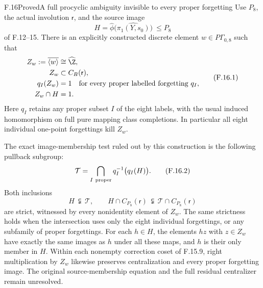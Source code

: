 \begin{claim}{F.16}{Proved}{A full procyclic ambiguity invisible to every proper forgetting}
Use $P_8$, the actual involution $\mathsf r$, and the
source image
\[
       H=\widehat\phi\bigl(\widehat{\pi_1(Y,s_0)}\bigr)
                         \ \leq P_8
\]
of F.12--15.  There is an explicitly constructed discrete
element $w\in P\Gamma_{0,8}$ such that
\[
\begin{split}
 Z_w:=\overline{\langle w\rangle}&\cong\widehat\Z,\\
 Z_w&\subset C_B(\mathsf r),\\
 q_I(Z_w)&=1
       \quad\text{for every proper labelled forgetting }q_I,\\
 Z_w\cap H&=1 .
\end{split}                                                     \tag{F.16.1}
\]
Here $q_I$ retains any proper subset $I$ of the eight
labels, with the usual induced homomorphism on full
pure mapping class completions.  In particular all
eight individual one-point forgettings kill $Z_w$.

The exact image-membership test ruled out by this
construction is the following pullback subgroup:
\[
 \mathcal T=
       \bigcap_{I\ {\rm proper}}
                     q_I^{-1}\bigl(q_I(H)\bigr).
                                                               \tag{F.16.2}
\]
Both inclusions
\[
 H\ \subsetneqq\ \mathcal T,\qquad
 H\cap C_{P_8}(\mathsf r)\
       \subsetneqq\
          \mathcal T\cap C_{P_8}(\mathsf r)
                                                               \tag{F.16.3}
\]
are strict, witnessed by every nonidentity element of
$Z_w$.  The same strictness holds when the intersection
uses only the eight individual forgettings, or any
subfamily of proper forgettings.
For each $h\in H$, the elements $hz$ with $z\in Z_w$
have exactly the same images as $h$ under all these
maps, and $h$ is their only member in $H$.
Within each nonempty correction coset of F.15.9,
right multiplication by $Z_w$ likewise preserves
centralization and every proper forgetting image.
The original source-membership equation and the
full residual centralizer remain unresolved.
\end{claim}

